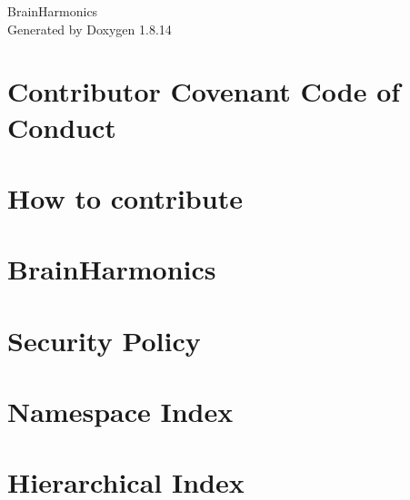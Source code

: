 \documentclass[twoside]{book}
\newcommand{\+}{\discretionary{\mbox{\scriptsize$\hookleftarrow$}}{}{}}
\newcommand{\clearemptydoublepage}{%
  \newpage{\pagestyle{empty}\cleardoublepage}%
}
\begin{document}
\hypersetup{pageanchor=false,
             bookmarksnumbered=true,
             pdfencoding=unicode
            }
\begin{titlepage}
\vspace*{7cm}
\begin{center}%
{\Large Brain\+Harmonics }\\
\vspace*{1cm}
{\large Generated by Doxygen 1.8.14}\\
\end{center}
\end{titlepage}
\clearemptydoublepage
{}
\tableofcontents
\clearemptydoublepage
{}
\hypersetup{pageanchor=true}

\chapter{Contributor Covenant Code of Conduct}
\label{md__home_pbisaacs_Developer_BrainHarmonics_CODE_OF_CONDUCT}

\chapter{How to contribute}
\label{md__home_pbisaacs_Developer_BrainHarmonics_CONTRIBUTING}

\chapter{Brain\+Harmonics}
\label{md__home_pbisaacs_Developer_BrainHarmonics_README}

\chapter{Security Policy}
\label{md__home_pbisaacs_Developer_BrainHarmonics_SECURITY}

\chapter{Namespace Index}

\chapter{Hierarchical Index}

\end{document}
